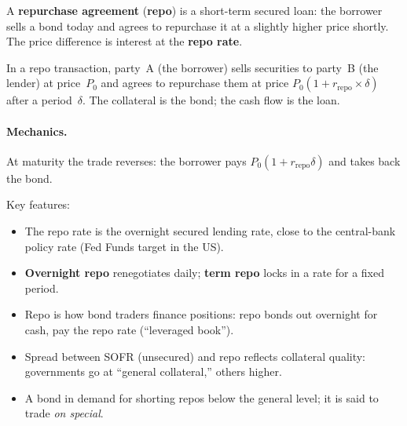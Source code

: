A \textbf{repurchase agreement} (\textbf{repo}) is a short-term
secured loan: the borrower sells a bond today and agrees to repurchase
it at a slightly higher price shortly.  The price difference is
interest at the \textbf{repo rate}.

\begin{definition}[Repo]
In a repo transaction, party~A (the borrower) sells securities to
party~B (the lender) at price~$P_0$ and agrees to repurchase them at
price $P_0(1 + r_{\text{repo}} \times \delta)$ after a period~$\delta$.
The collateral is the bond; the cash flow is the loan.
\end{definition}

\paragraph{Mechanics.}
\begin{center}
\end{center}

At maturity the trade reverses: the borrower pays
$P_0(1 + r_{\text{repo}}\delta)$ and takes back the bond.

Key features:
\begin{itemize}
  \item The repo rate is the overnight secured lending rate, close to
    the central-bank policy rate (Fed Funds target in the US).
  \item \textbf{Overnight repo} renegotiates daily; \textbf{term repo}
    locks in a rate for a fixed period.
  \item Repo is how bond traders finance positions: repo bonds out
    overnight for cash, pay the repo rate (``leveraged book'').
  \item Spread between SOFR (unsecured) and repo reflects collateral
    quality: governments go at ``general collateral,'' others higher.
  \item A bond in demand for shorting repos below the general level;
    it is said to trade \emph{on special}.
\end{itemize}

